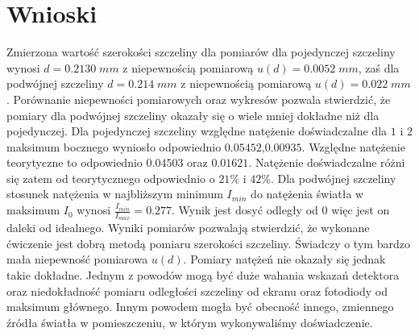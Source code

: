 \documentclass[12pt]{article}
\begin{document}
\section{Wnioski} 
Zmierzona wartość szerokości szczeliny dla pomiarów dla pojedynczej szczeliny wynosi $d=0.2130\;mm$ z niepewnością pomiarową $u(d)=0.0052\;mm$, zaś dla podwójnej szczeliny $d=0.214\;mm$ z niepewnością pomiarową $u(d)=0.022\;mm$. Porównanie niepewności pomiarowych oraz wykresów pozwala stwierdzić, że 
pomiary dla podwójnej szczeliny okazały się o wiele mniej dokładne niż dla pojedynczej. Dla pojedynczej szczeliny względne natężenie doświadczalne dla $1$ i $2$ maksimum bocznego wyniosło odpowiednio $0.05452$,$0.00935$. Względne natężenie teorytyczne to odpowiednio $0.04503$ oraz $0.01621$. Natężenie doświadczalne różni się zatem od teorytycznego odpowiednio o $21\%$ i $42\%$. Dla podwójnej szczeliny stosunek natężenia w najbliższym minimum $I_{min}$ do natężenia światła w maksimum $I_0$ wynosi $\frac{I_{min}}{I_{max}}=0.277$. Wynik jest dosyć odległy od $0$ więc jest on daleki od idealnego.
Wyniki pomiarów pozwalają stwierdzić, że wykonane ćwiczenie jest dobrą metodą pomiaru szerokości szczeliny. Świadczy o tym bardzo mała niepewność pomiarowa $u(d)$. Pomiary natężeń nie okazały się jednak takie dokładne. Jednym z powodów mogą być duże wahania wskazań detektora oraz niedokładność pomiaru odległości szczeliny od ekranu oraz fotodiody od maksimum głównego. Innym powodem mogła być obecność innego, zmiennego źródła światła w pomieszczeniu, w którym wykonywaliśmy doświadczenie.
\end{document}
